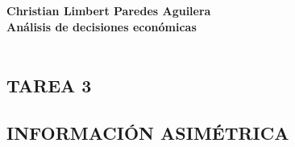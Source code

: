 \textbf{\bfseries Christian Limbert Paredes Aguilera}\\
\textbf{Análisis de decisiones económicas}\\\\
\subsection*{\center TAREA 3}
\vspace{.4cm}
\subsection*{\center INFORMACIÓN ASIMÉTRICA}
\vspace{1cm}

\begin{multicols}{2}


\end{multicols}
